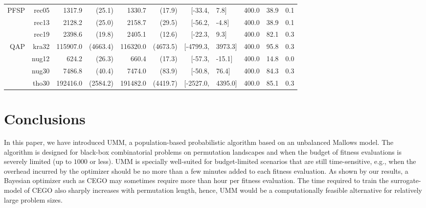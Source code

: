 \documentclass[runningheads]{llncs}
\begin{document}
\begin{table}[tb]
{\begin{tabular}{r@{\hskip -2ex}*{5}{r}rl@{\hskip -2ex}*{3}{r}}
   PFSP     & rec05        & 1317.9                  & (25.1)     & 1330.7    & (17.9)                 & $[$-33.4,     & 7.8$]$        & 400.0& 38.9 & 0.1  \\
       & rec13        & 2128.2                  & (25.0)     & 2158.7    & (29.5)                 & $[$-56.2,     & -4.8$]$       & 400.0& 38.9 & 0.1  \\
       & rec19        & 2398.6                  & (19.8)     & 2405.1    & (12.6)                 & $[$-22.3,     & 9.3$]$        & 400.0& 82.1 & 0.3  \\\midrule
    QAP     & kra32        & 115907.0                & (4663.4)   & 116320.0  & (4673.5)               & $[$-4799.3,   & 3973.3$]$     & 400.0& 95.8 & 0.3  \\
        & nug12        & 624.2                   & (26.3)     & 660.4     & (17.3)                 & $[$-57.3,     & -15.1$]$      & 400.0& 14.8 & 0.0  \\
        & nug30        & 7486.8                  & (40.4)     & 7474.0    & (83.9)                 & $[$-50.8,     & 76.4$]$       & 400.0& 84.3 & 0.3  \\
        & tho30        & 192416.0                & (2584.2)   & 191482.0  & (4419.7)               & $[$-2527.0,   & 4395.0$]$     & 400.0& 85.1 & 0.3  \\
\bottomrule
\end{tabular}}
\end{table}




\section{Conclusions}

In this paper, we have introduced UMM, a population-based probabilistic
algorithm based on an unbalanced Mallows model. The algorithm is designed for
black-box combinatorial problems on permutation landscapes and when the budget
of fitness evaluations is severely limited (up to $1000$ or less).  UMM is
specially well-suited for budget-limited scenarios that are still
time-sensitive, e.g., when the overhead incurred by the optimizer should be no
more than a few minutes added to each fitness evaluation. As shown by our
results, a Bayesian optimizer such as CEGO may sometimes require more than hour
per fitness evaluation. The time required to train the surrogate-model of CEGO
also sharply increases with permutation length, hence, UMM would be a
computationally feasible alternative for relatively large problem sizes.
\end{document}
